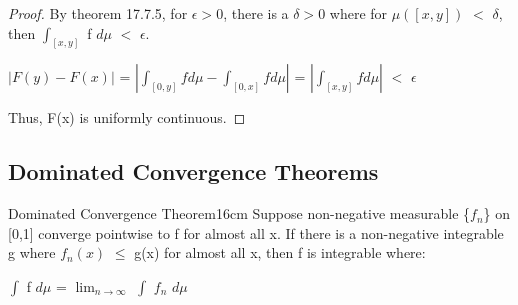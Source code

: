     \begin{proof}
        By {\color{red} theorem 17.7.5}, for $\epsilon > 0$,
        there is a $\delta > 0$ where for $\mu([x,y])$ $<$ $\delta$, then
        $\int_{[x,y]}$ f $d\mu$ $<$ $\epsilon$.

        \hspace{0.5cm}
        $|F(y) - F(x)|$
        = $|\int_{[0,y]} f d\mu - \int_{[0,x]} f d\mu|$
        = $|\int_{[x,y]} f d\mu|$
        $<$ $\epsilon$

        Thus, F(x) is uniformly continuous.
    \end{proof}

    \vspace{0.5cm}





\subsection{ Dominated Convergence Theorems }

    \begin{wtheorem}{Dominated Convergence Theorem}{16cm}
        Suppose non-negative measurable \{$f_n$\} on [0,1]
        converge pointwise to f for almost all x.
        If there is a non-negative integrable g where
        $f_n(x)$ $\leq$ g(x) for almost all x, then f is integrable where:

        \hspace{0.5cm}
        $\int$ f $d\mu$ = $\lim_{n \rightarrow \infty}$ $\int$ $f_n$ $d\mu$
    \end{wtheorem}

